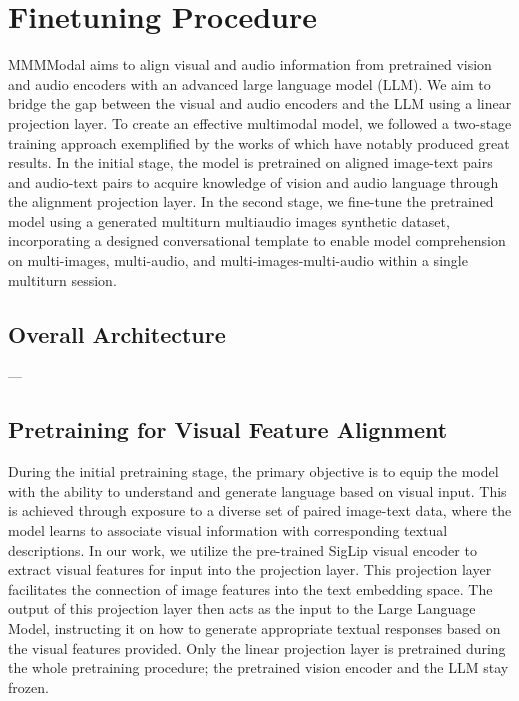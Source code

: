 \documentclass[preprint]{article}
\begin{document}
\section{Finetuning Procedure}

MMMModal aims to align visual and audio information from pretrained vision and audio encoders with an advanced large language model (LLM). We aim to bridge the gap between the visual and audio encoders and the LLM using a linear projection layer. To create an effective multimodal model, we followed a two-stage training approach exemplified by the works of \cite{han2023chartllama,zhu2023minigpt4,liu2024hidden} which have notably produced great results. In the initial stage, the model is pretrained on aligned image-text pairs and audio-text pairs to acquire knowledge of vision and audio language through the alignment projection layer. In the second stage, we fine-tune the pretrained model using a generated multiturn multiaudio images synthetic dataset, incorporating a designed conversational template to enable model comprehension on multi-images, multi-audio, and multi-images-multi-audio within a single multiturn session.

\subsection{Overall Architecture}

---

\subsection{Pretraining for Visual Feature Alignment}

During the initial pretraining stage, the primary objective is to equip the model with the ability to understand and generate language based on visual input. This is achieved through exposure to a diverse set of paired image-text data, where the model learns to associate visual information with corresponding textual descriptions. In our work, we utilize the pre-trained SigLip visual encoder to extract visual features for input into the projection layer. This projection layer facilitates the connection of image features into the text embedding space. The output of this projection layer then acts as the input to the Large Language Model, instructing it on how to generate appropriate textual responses based on the visual features provided. Only the linear projection layer is pretrained during the whole pretraining procedure; the pretrained vision encoder and the LLM stay frozen.
\end{document}
